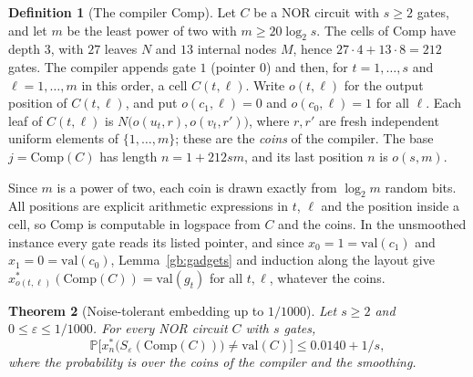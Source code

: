 \documentclass[11pt]{amsart}
\newtheorem{theorem}{Theorem}
\theoremstyle{definition}
\newtheorem{definition}[theorem]{Definition}
\theoremstyle{remark}
\newcommand{\eps}{\varepsilon}
\newcommand{\val}{\mathrm{val}}
\newcommand{\PP}{\mathbb{P}}
\newcommand{\Comp}{\mathrm{Comp}}
\begin{document}
\begin{definition}[The compiler $\Comp$]\label{gb:compiler}
Let $C$ be a NOR circuit with $s\ge2$ gates, and let $m$ be the least power
of two with $m\ge 20\log_2 s$. The cells of $\Comp$ have depth $3$, with
$27$ leaves $N$ and $13$ internal nodes $M$, hence $27\cdot4+13\cdot8=212$
gates. The compiler appends gate $1$ (pointer $0$) and then, for
$t=1,\dots,s$ and $\ell=1,\dots,m$ in this order, a cell $C(t,\ell)$. Write
$o(t,\ell)$ for the output position of $C(t,\ell)$, and put $o(c_1,\ell)=0$
and $o(c_0,\ell)=1$ for all $\ell$. Each leaf of $C(t,\ell)$ is
$N\bigl(o(u_t,r),o(v_t,r')\bigr)$, where $r,r'$ are fresh independent
uniform elements of $\{1,\dots,m\}$; these are the \emph{coins} of the
compiler. The base $j=\Comp(C)$ has length $n=1+212sm$, and its last
position $n$ is $o(s,m)$.
\end{definition}

Since $m$ is a power of two, each coin is drawn exactly from $\log_2 m$
random bits. All positions are explicit arithmetic expressions in $t$,
$\ell$ and the position inside a cell, so $\Comp$ is computable in logspace
from $C$ and the coins. In the unsmoothed instance every gate reads its
listed pointer, and since $x_0=1=\val(c_1)$ and $x_1=0=\val(c_0)$,
Lemma~\ref{gb:gadgets} and induction along the layout give
$x^*_{o(t,\ell)}(\Comp(C))=\val(g_t)$ for all $t,\ell$, whatever the coins.

\begin{theorem}[Noise-tolerant embedding up to $1/1000$]\label{gb:thm1000}
Let $s\ge2$ and $0\le\eps\le1/1000$. For every NOR circuit $C$ with $s$
gates,
\[
\PP\bigl[x^*_n\bigl(S_\eps(\Comp(C))\bigr)\ne\val(C)\bigr]\le 0.0140+1/s,
\]
where the probability is over the coins of the compiler and the smoothing.
\end{theorem}
\end{document}
